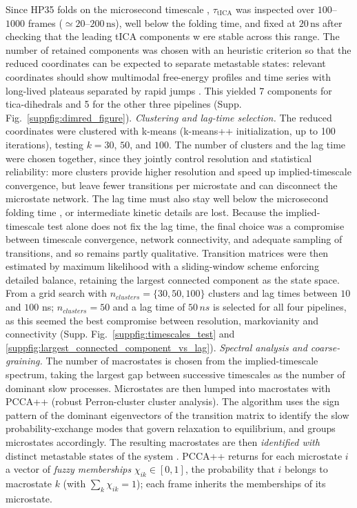 \documentclass[prl,twocolumn]{revtex4-1}
\begin{document}
Since HP35 folds on the microsecond timescale \cite{PDB, Lindorff-Larsen2011}, $\tau_{\mathrm{tICA}}$ was inspected over $100$--$1000$ frames ($\simeq 20$--$200\,\mathrm{ns}$), well below the folding time, and fixed at $20\,\mathrm{ns}$ after checking that the leading tICA components w ere stable across this range. The number of retained components was chosen with an heuristic criterion so that the reduced coordinates can be expected to separate metastable states: relevant coordinates should show multimodal free-energy profiles \cite{selecting_features} and time series with long-lived plateaus separated by rapid jumps \cite{pyemma_jumps}. This yielded 7 components for tica-dihedrals and 5 for the other three pipelines (Supp. Fig.~\ref{suppfig:dimred_figure}).
\smallskip \newline \textit{Clustering and lag-time selection.}
The reduced coordinates were clustered with k-means (k-means++ initialization, up to 100 iterations), testing $k = 30$, $50$, and $100$. The number of clusters and the lag time were chosen together, since they jointly control resolution and statistical reliability: more clusters provide higher resolution and speed up implied-timescale convergence, but leave fewer transitions per microstate and can disconnect the microstate network. The lag time must also stay well below the microsecond folding time \cite{Lindorff-Larsen2011}, or intermediate kinetic details are lost. Because the implied-timescale test alone does not fix the lag time, the final choice was a compromise between timescale convergence, network connectivity, and adequate sampling of transitions, and so remains partly qualitative. Transition matrices were then estimated by maximum likelihood with a sliding-window scheme \cite[Ch. 4.1]{thebible} enforcing detailed balance, retaining the largest connected component as the state space. From a grid search with $n_{clusters}=\{30, 50, 100\}$ clusters and lag times between $10$ and $100$ ns; $n_{clusters}=50$  and a lag time of $50\,ns$ is selected for all four pipelines, as this seemed the best compromise between resolution, markovianity and connectivity (Supp. Fig.~\ref{suppfig:timescales_test} and \ref{suppfig:largest_connected_component_vs_lag}).
\smallskip \newline \textit{Spectral analysis and coarse-graining.}
The number of macrostates is chosen from the implied-timescale spectrum, taking the largest gap between successive timescales as the number of dominant slow processes. Microstates are then lumped into macrostates with PCCA++ (robust Perron-cluster cluster analysis). The algorithm uses the sign pattern of the dominant eigenvectors of the transition matrix to identify the slow probability-exchange modes that govern relaxation to equilibrium, and groups microstates accordingly. The resulting macrostates are then \textit{identified with} distinct metastable states of the system \cite[Ch. 2.5.1--2.5.2]{thebible}. PCCA++ returns for each microstate $i$ a vector of \textit{fuzzy memberships} $\chi_{ik} \in [0,1]$, the probability that $i$ belongs to macrostate $k$ (with $\sum_k \chi_{ik} = 1$); each frame inherits the memberships of its microstate. 
\end{document}
